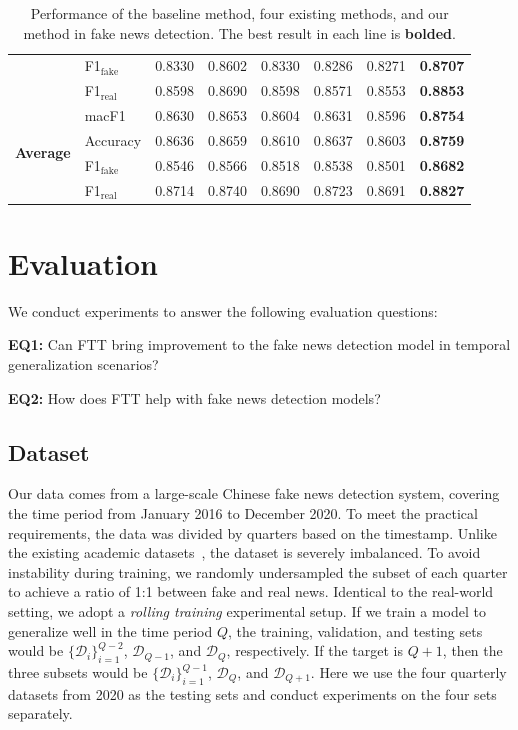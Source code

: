 \documentclass[11pt]{article}
\begin{document}
\begin{table}[htbp]
{{\begin{tabular}{c | p{2.0cm}<{\centering} | p{2.18cm}<{\centering} p{2.18cm}<{\centering} p{2.18cm}<{\centering} p{2.18cm}<{\centering} p{2.18cm}<{\centering} p{2.18cm}<{\centering}}
    & F1$_\mathrm{fake}$ & 0.8330 & 0.8602 & 0.8330 & 0.8286 & 0.8271 & \textbf{0.8707}\\
    & F1$_\mathrm{real}$ & 0.8598 & 0.8690 & 0.8598 & 0.8571 & 0.8553 & \textbf{0.8853}\\
    \midrule
    \multirow{4}{*}{\textbf{Average}} & macF1 & 0.8630 & 0.8653 & 0.8604 & 0.8631 & 0.8596 & \textbf{0.8754}\\
    & Accuracy & 0.8636 & 0.8659 & 0.8610 & 0.8637 & 0.8603 & \textbf{0.8759}\\
    & F1$_\mathrm{fake}$ & 0.8546 & 0.8566 & 0.8518 & 0.8538 & 0.8501 & \textbf{0.8682}\\
    & F1$_\mathrm{real}$ & 0.8714 & 0.8740 & 0.8690 & 0.8723 & 0.8691 & \textbf{0.8827}\\
    \bottomrule
    \end{tabular}
    }
  }
  \caption{Performance of the baseline method, four existing methods, and our method in fake news detection. The best result in each line is \textbf{bolded}.}
  \label{tab:main_result}%
\end{table}%

\section{Evaluation}
    \label{sec:exp}
    We conduct experiments to answer the following evaluation questions:
    \begin{compactitem}
     \item \textbf{EQ1:} 
     Can FTT bring improvement to the fake news detection model in temporal generalization scenarios?
     \item \textbf{EQ2:} How does FTT help with fake news detection models?
    \end{compactitem}

\subsection{Dataset}
Our data comes from a large-scale Chinese fake news detection system, covering the time period from January 2016 to December 2020. To meet the practical requirements, the data was divided by quarters based on the timestamp. Unlike the existing academic datasets~\cite{fakenewsnet,sheng-etal-2022-zoom}, the dataset is severely imbalanced. To avoid instability during training, we randomly undersampled the subset of each quarter to achieve a ratio of 1:1 between fake and real news.
Identical to the real-world setting, we adopt a \textit{rolling training} experimental setup. If we train a model to generalize well in the time period $Q$, the training, validation, and testing sets would be $\{\mathcal{D}_i\}_{i=1}^{Q-2}$, $\mathcal{D}_{Q-1}$, and $\mathcal{D}_Q$, respectively. If the target is $Q+1$, then the three subsets would be $\{\mathcal{D}_i\}_{i=1}^{Q-1}$, $\mathcal{D}_{Q}$, and $\mathcal{D}_{Q+1}$.
Here we use the four quarterly datasets from 2020 as the testing sets and conduct experiments on the four sets separately.
\end{document}
